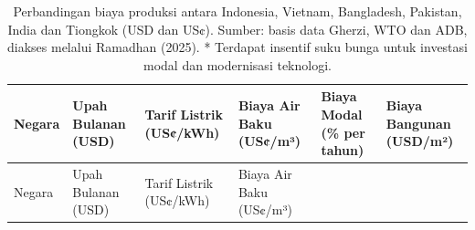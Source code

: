 \documentclass[
  manuscript=article,
  layout=publish,
  year=2026,
  volume=1,
]{den}
\begin{document}
\begin{longtable}[]{@{}
  >{\raggedright\arraybackslash}p{}
  >{\raggedleft\arraybackslash}p{}
  >{\raggedleft\arraybackslash}p{}
  >{\raggedleft\arraybackslash}p{}
  >{\raggedleft\arraybackslash}p{}
  >{\raggedleft\arraybackslash}p{}@{}}
\caption{Perbandingan biaya produksi antara Indonesia, Vietnam,
Bangladesh, Pakistan, India dan Tiongkok (USD dan US¢). Sumber: basis
data Gherzi, WTO dan ADB, diakses melalui Ramadhan (2025). * Terdapat
insentif suku bunga untuk investasi modal dan modernisasi
teknologi.}\label{tbl-costs}\tabularnewline
\toprule\noalign{}
\begin{minipage}[b]{\linewidth}\raggedright
Negara
\end{minipage} & \begin{minipage}[b]{\linewidth}\raggedleft
Upah Bulanan (USD)
\end{minipage} & \begin{minipage}[b]{\linewidth}\raggedleft
Tarif Listrik (US¢/kWh)
\end{minipage} & \begin{minipage}[b]{\linewidth}\raggedleft
Biaya Air Baku (US¢/m³)
\end{minipage} & \begin{minipage}[b]{\linewidth}\raggedleft
Biaya Modal (\% per tahun)
\end{minipage} & \begin{minipage}[b]{\linewidth}\raggedleft
Biaya Bangunan (USD/m²)
\end{minipage} \\
\midrule\noalign{}
\endfirsthead
\toprule\noalign{}
\begin{minipage}[b]{\linewidth}\raggedright
Negara
\end{minipage} & \begin{minipage}[b]{\linewidth}\raggedleft
Upah Bulanan (USD)
\end{minipage} & \begin{minipage}[b]{\linewidth}\raggedleft
Tarif Listrik (US¢/kWh)
\end{minipage} & \begin{minipage}[b]{\linewidth}\raggedleft
Biaya Air Baku (US¢/m³)
\end{minipage} & \begin{minipage}[b]{\linewidth}\raggedleft

\end{minipage}
\end{longtable}
\end{document}
